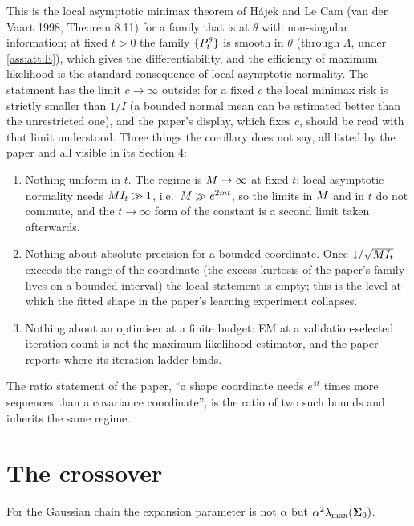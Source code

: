 This is the local asymptotic minimax theorem of H\'ajek and Le Cam (van der Vaart 1998,
Theorem 8.11) for a family that is  at $\theta$
with non-singular information; at fixed $t>0$ the family $\{P_t^\theta\}$ is smooth in
$\theta$ (through $\Lambda$, under \cref{ass:att:E}), which gives the differentiability,
and the efficiency of maximum likelihood is the standard consequence of local
asymptotic normality. The statement has the limit $c\to\infty$ outside: for a fixed
$c$ the local minimax risk is strictly smaller than $1/I$ (a bounded normal mean can be
estimated better than the unrestricted one), and the paper's display, which fixes $c$,
should be read with that limit understood. Three things the corollary does not say,
all listed by the paper and all visible in its Section 4:
\begin{enumerate}
\item Nothing uniform in $t$. The regime is $M\to\infty$ at fixed $t$; local
  asymptotic normality needs $M I_t\gg1$, i.e.\ $M\gg e^{2mt}$, so the limits in
  $M$ and in $t$ do not commute, and the $t\to\infty$ form of the constant is a
  second limit taken afterwards.
\item Nothing about absolute precision for a bounded coordinate. Once
  $1/\sqrt{M I_t}$ exceeds the range of the coordinate (the excess kurtosis of the
  paper's family lives on a bounded interval) the local statement is empty; this is
  the level at which the fitted shape in the paper's learning experiment collapses.
\item Nothing about an optimiser at a finite budget: EM at a validation-selected
  iteration count is not the maximum-likelihood estimator, and the paper reports where
  its iteration ladder binds.
\end{enumerate}
The ratio statement of the paper, ``a shape coordinate needs $e^{4t}$ times more
sequences than a covariance coordinate'', is the ratio of two such bounds and inherits
the same regime.

\section{The crossover}
\label{sec:att:crossover}

For the Gaussian chain the expansion parameter is not $\alpha$ but $\alpha^2\lambda_{\max}(\mathbf{\Sigma}_0)$.


